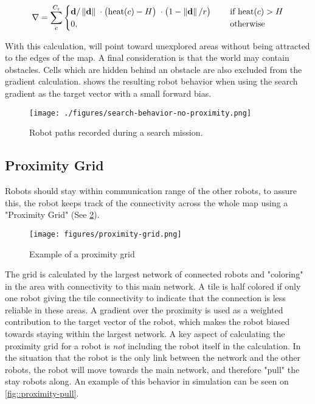 \begin{equation}
\label{eq:robot-gradient}
    \nabla = \sum_c^{C_\mathrm{r}}
    \begin{cases}
        \mathbf{d}/\left\lVert\mathbf{d}\right\rVert      \; \cdot
        \big(\mathrm{heat}(c) - H\big)    \; \cdot
        \big(1 - \left\lVert\mathbf{d}\right\rVert/r\big) \; \quad &\text{if } \mathrm{heat}(c) > H
        \\
        0, \quad &\text{otherwise}
    \end{cases}
\end{equation}

With this calculation, will point toward unexplored areas without being attracted to the edges of the map. A final consideration is that the world may contain obstacles. Cells which are hidden behind an obstacle are also excluded from the gradient calculation.  shows the resulting robot behavior when using the search gradient as the target vector with a small forward bias.

\begin{figure}[h]
    \begin{center}
        \texttt{[image: ./figures/search-behavior-no-proximity.png]}
    \end{center}
    \caption{Robot paths recorded during a search mission.}
    \label{fig:search-no-proximity}
\end{figure}

\subsection{Proximity Grid}
Robots should stay within communication range of the other robots, to assure this, the robot keeps track of the connectivity {\color{red} across} the whole map using a "Proximity Grid" (See \cref{fig:proximity-grid}). \\

\begin{figure}[h]
    \begin{center}
        \texttt{[image: figures/proximity-grid.png]}
    \end{center}
    \caption{Example of a proximity grid}\label{fig:proximity-grid}
\end{figure}

The grid is calculated by the largest network of connected robots and "coloring" in the area with connectivity to this main network. A tile is half colored if only one robot giving the tile connectivity to indicate that the connection is less reliable in these areas. A {\color{red} gradient} over the proximity is used as a weighted contribution to the target vector of the robot, which makes the robot biased towards staying within the largest network. A key aspect of calculating the proximity grid for a robot is \emph{not} including the robot itself in the calculation. In the situation that the robot is the only link between the network and the other robots, the robot will move towards the main network, and therefore "pull" the stay robots along. An example of this behavior in simulation can be seen on \cref{fig::proximity-pull}.

